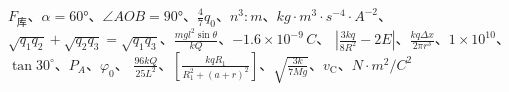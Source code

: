 \documentclass[fontset=none]{ctexart}
\begin{document}
$F_{\text{库}}$、$\alpha=60°$、$\angle AOB=90°$、$\frac{4}{7}q_0$、$n^3\!:\!m$、$\unit{kg\cdot m^{3}\cdot s^{-4}\cdot A^{-2}}$、
$\sqrt{q_1q_2}+\sqrt{q_2q_3}=\sqrt{q_1q_3}$、$\frac{mgl^{2}\sin\theta}{kQ}$、$-1.6\times10^{-9}\,\unit{C}$、
$\left|\frac{3kq}{8R^{2}}-2E\right|$、$\frac{kq\Delta x}{2\pi r^{3}}$、$1\times10^{10}$、$\tan30^{\circ}$、$P_{A}$、$\varphi_0$、
$\frac{96kQ}{25L^{2}}$、$\left[\frac{kqR_1}{R_1^{2}+(a+r)^{2}}\right]$、$\sqrt{\frac{3k}{7Mg}}$、$v_{\text{C}}$、$\unit{N\cdot m^{2}/C^{2}}$
\end{document}
